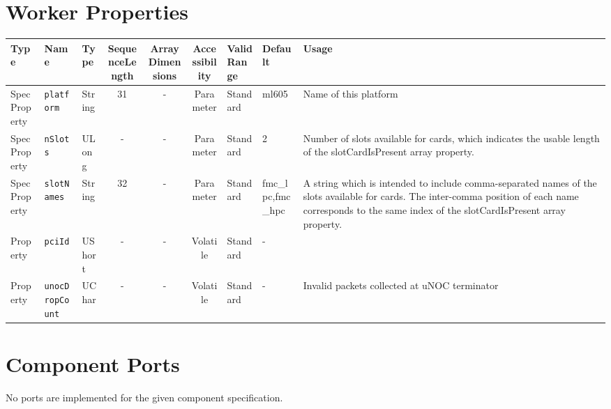 \documentclass{article}
\begin{document}
\begin{landscape}
	\section*{Worker Properties}
	\begin{scriptsize}
		\begin{tabular}{|p{1.5cm}|p{2.5cm}|p{1cm}|c|c|c|p{2cm}|p{2cm}|p{3cm}|}
			\hline
			\rowcolor{blue}
			Type     & Name                      & Type  & SequenceLength & ArrayDimensions & Accessibility       & Valid Range & Default & Usage                                      \\
			\hline
			SpecProperty & \verb+platform+       & String & 31            & -               & Parameter & Standard & ml605 & Name of this platform               \\
			\hline
			SpecProperty & \verb+nSlots+         & ULong  & -             & -               & Parameter & Standard & 2 & Number of slots available for cards, which indicates the usable length of the slotCardIsPresent array property. \\
			\hline
			SpecProperty & \verb+slotNames+      & String & 32            & -               & Parameter & Standard & fmc\_lpc,fmc\_hpc & A string which is intended to include comma-separated names of the slots available for cards. The inter-comma position of each name corresponds to the same index of the slotCardIsPresent array property. \\
			\hline
			Property & \verb+pciId+              & UShort & -             & -               & Volatile            & Standard    & -       &                                  \\
			\hline
			Property & \verb+unocDropCount+      & UChar & -              & -               & Volatile            & Standard    & -       & Invalid packets collected at uNOC terminator \\
			\hline
		\end{tabular}
	\end{scriptsize}

	\section*{Component Ports}
	No ports are implemented for the given component specification.


\end{landscape}
\end{document}
